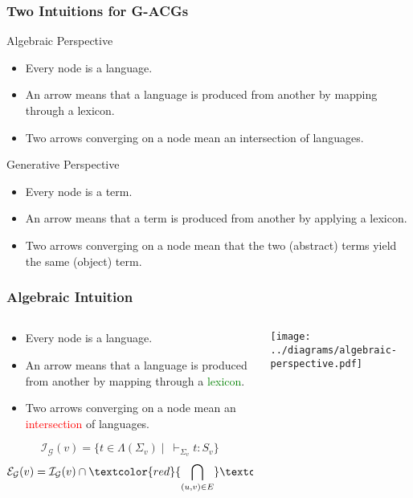 \documentclass{beamer}
\begin{document}
\begin{frame}
  \frametitle{Two Intuitions for G-ACGs}

  \begin{block}{Algebraic Perspective}
    \begin{itemize}
    \item Every node is a language.
    \item An arrow means that a language is produced from another by
      mapping through a lexicon.
    \item Two arrows converging on a node mean an intersection of
      languages.
    \end{itemize}
  \end{block}
  \begin{block}{Generative Perspective}
    \begin{itemize}
    \item Every node is a term.
    \item An arrow means that a term is produced from another by
      applying a lexicon.
    \item Two arrows converging on a node mean that the two (abstract)
      terms yield the same (object) term.
    \end{itemize}
  \end{block}
\end{frame}


\begin{frame}
  \frametitle{Algebraic Intuition}

  \begin{columns}[c]
    \begin{column}{0.7\textwidth}
      \begin{itemize}
      \item Every node is a language.
      \item An arrow means that a language is produced from another by
        mapping through a \textcolor{green}{lexicon}.
      \item Two arrows converging on a node mean an
        \textcolor{red}{intersection} of languages.
      \end{itemize}

$$
\mathcal{I}_{\mathcal{G}}(v) = \{t \in \Lambda(\Sigma_v)
\mid\ \vdash_{\Sigma_v} t : S_v\}
$$
$$
\mathcal{E}_{\mathcal{G}}(v) = \mathcal{I}_{\mathcal{G}}(v) \cap
\textcolor{red}{\bigcap_{(u,v) \in E}}
\textcolor{green}{\mathcal{L}_{(u,v)}}(\mathcal{E}_{\mathcal{G}}(u)).
$$
    \end{column}
    \begin{column}{0.3\textwidth}
      \texttt{[image: ../diagrams/algebraic-perspective.pdf]}
    \end{column}
  \end{columns}

\end{frame}
\end{document}

